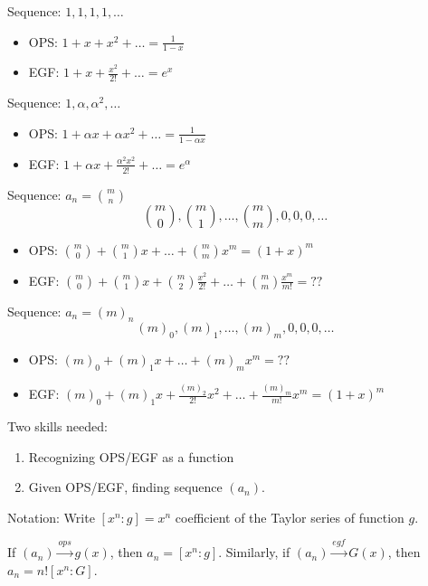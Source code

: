 \documentclass[12pt]{article}
\begin{document}

\eg Sequence: $1,1,1,1,\dots$
\begin{itemize}
    \item OPS: $1+x+x^2+\dots=\frac{1}{1-x}$
    \item EGF: $1+x+\frac{x^2}{2!}+\dots = e^x$
\end{itemize}

\eg Sequence: $1,\alpha,\alpha^2,\dots$
\begin{itemize}
    \item OPS: $1+\alpha x+\alpha x^2+\dots=\frac{1}{1-\alpha x}$
    \item EGF: $1+\alpha x+\frac{\alpha^2x^2}{2!}+\dots = e^{\alpha }$
\end{itemize}

\eg Sequence: $a_n={m\choose n}$ \[{m\choose 0}, {m\choose 1}, \dots, {m\choose m}, 0,0,0,\dots\]
\begin{itemize}
    \item OPS: ${m\choose 0}+ {m\choose 1}x+ \dots+ {m\choose m}x^m =(1+x)^m$
    \item EGF: ${m\choose 0}+ {m\choose 1}x+{m\choose 2}\frac{x^2}{2!}+ \dots+{m\choose m}\frac{x^m}{m!}=??$
\end{itemize}

\eg Sequence: $a_n=(m)_n$ \[(m)_0,(m)_1,\dots, (m)_m, 0,0,0,\dots\]
\begin{itemize}
    \item OPS: $(m)_0+(m)_1x+\dots+(m)_mx^m=??$
    \item EGF: $(m)_0+(m)_1x+\frac{(m)_2}{2!}x^2+\dots +\frac{(m)_m}{m!}x^m = (1+x)^m$
\end{itemize}

\rmk Two skills needed: \begin{enumerate}
    \item Recognizing OPS/EGF as a function
    \item Given OPS/EGF, finding sequence $(a_n)$.
\end{enumerate}

 Notation: Write $[x^n:g]= x^n$ coefficient of the Taylor series of function $g$.

\rmk If $(a_n)\xrightarrow{ops} g(x)$, then $a_n=[x^n:g]$. Similarly, if $(a_n)\xrightarrow{egf}G(x)$, then $a_n=n![x^n:G]$. 
\end{document}
